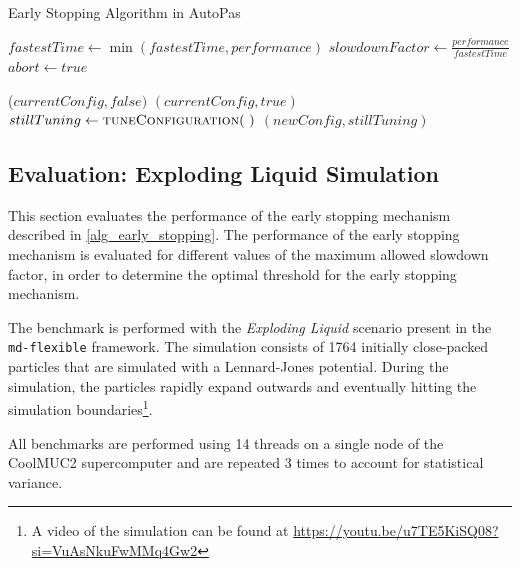 \documentclass[conference]{IEEEtran}
\begin{document}
\begin{algorithm}[H]
    \small
    \caption{Early Stopping Algorithm in AutoPas}
    \label{alg_early_stopping}
    \begin{algorithmic}[1]
        \State $fastestTime \gets \min(fastestTime, performance)$
        \State $slowdownFactor \gets \frac{performance}{fastestTime}$
        \State $abort \gets true$
        \EndIf
        \EndProcedure

        \vspace{0.5em}

        \State \Return ($currentConfig, false)$
            \State \Return $(currentConfig, true)$
            \Else
            \State $stillTuning \gets \Call{tuneConfiguration}{~}$
            \State \Return $(newConfig, stillTuning)$
        \EndIf
        \EndProcedure
    \end{algorithmic}

\end{algorithm}



\subsection{Evaluation: Exploding Liquid Simulation}
\label{sec:evaluation}

This section evaluates the performance of the early stopping mechanism described in \autoref{alg_early_stopping}. The performance of the early stopping mechanism is evaluated for different values of the maximum allowed slowdown factor, in order to determine the optimal threshold for the early stopping mechanism.

The benchmark is performed with the \textit{Exploding Liquid} scenario present in the \texttt{md-flexible} framework. The simulation consists of 1764 initially close-packed particles that are simulated with a Lennard-Jones potential. During the simulation, the particles rapidly expand outwards and eventually hitting the simulation boundaries\footnote{A video of the simulation can be found at \url{https://youtu.be/u7TE5KiSQ08?si=VuAsNkuFwMMq4Gw2}}.

All benchmarks are performed using 14 threads on a single node of the CoolMUC2 supercomputer  and are repeated 3 times to account for statistical variance.
\end{document}
